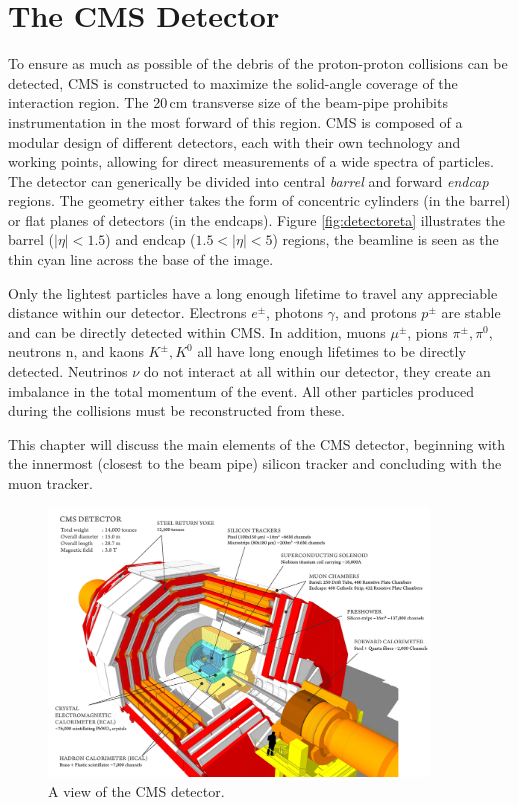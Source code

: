 \chapter{The CMS Detector}
\label{chap:detector}

To ensure as much as possible of the debris of the proton-proton collisions can be detected, CMS is constructed to maximize the solid-angle coverage of the interaction region. The 20$\,$cm transverse size of the beam-pipe prohibits instrumentation in the most forward of this region. CMS is composed of a modular design of different detectors, each with their own technology and working points, allowing for direct measurements of a wide spectra of particles. The detector can generically be divided into central \textit{barrel} and forward \textit{endcap} regions. The geometry either takes the form of concentric cylinders (in the barrel) or flat planes of detectors (in the endcaps). Figure \ref{fig:detectoreta} illustrates the barrel ($|\eta|<1.5$) and endcap ($1.5<|\eta|<5$) regions, the beamline is seen as the thin cyan line across the base of the image.  

Only the lightest particles have a long enough lifetime to travel any appreciable distance within our detector. Electrons $e^{\pm}$, photons $\gamma$, and protons $p^{\pm}$ are stable and can be directly detected within CMS. In addition, muons $\mu^{\pm}$, pions $\pi^{\pm}, \pi^{0}$, neutrons n, and kaons $K^{\pm}, K^{0}$ all have long enough lifetimes to be directly detected. Neutrinos $\nu$ do not interact at all within our detector, they create an imbalance in the total momentum of the event. All other particles produced during the collisions must be reconstructed from these.

This chapter will discuss the main elements of the CMS detector, beginning with the innermost (closest to the beam pipe) silicon tracker and concluding with the muon tracker. 

\begin{figure}[hbp!]
\centering
\includegraphics[width=0.9\textwidth]{figs/howcmsworks.png}
\caption{A view of the CMS detector.}
\label{fig:howcmsworks}
\end{figure}

